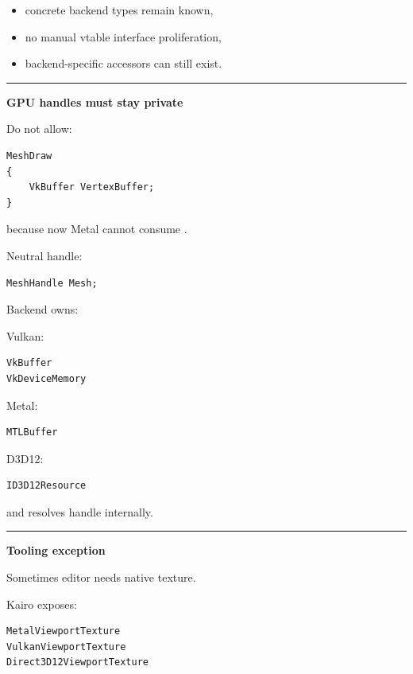\begin{itemize}
\tightlist
\item
  concrete backend types remain known,
\item
  no manual vtable interface proliferation,
\item
  backend-specific accessors can still exist.
\end{itemize}

\begin{center}\rule{0.5\linewidth}{0.5pt}\end{center}

\textbf{GPU handles must stay private}

Do not allow:

\begin{verbatim}
MeshDraw
{
    VkBuffer VertexBuffer;
}
\end{verbatim}

because now Metal cannot consume .

Neutral handle:

\begin{verbatim}
MeshHandle Mesh;
\end{verbatim}

Backend owns:

Vulkan:

\begin{verbatim}
VkBuffer
VkDeviceMemory
\end{verbatim}

Metal:

\begin{verbatim}
MTLBuffer
\end{verbatim}

D3D12:

\begin{verbatim}
ID3D12Resource
\end{verbatim}

and resolves handle internally.

\begin{center}\rule{0.5\linewidth}{0.5pt}\end{center}

\textbf{Tooling exception}

Sometimes editor needs native texture.

Kairo exposes:

\begin{verbatim}
MetalViewportTexture
VulkanViewportTexture
Direct3D12ViewportTexture
\end{verbatim}

